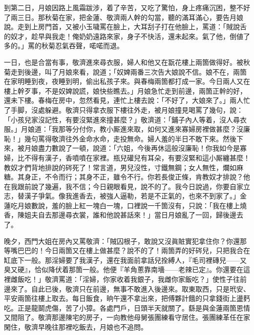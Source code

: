 到第二日，月娘因路上風霜跋涉，着了辛苦，又吃了驚怕，身上疼痛沉困，整不好了兩三日。那秋菊在家，把金蓮、敬濟兩人幹的勾當，聽的滿耳滿心，要告月娘說。走到上房門首，又被小玉噦罵在臉上，大耳刮子打在他臉上，罵道：「賊說舌的奴才，趁早與我走！俺奶奶遠路來家，身子不快活，還未起來。氣了他，倒値了多的。」罵的秋菊忍氣吞聲，喏喏而退。

一日，也是合當有事，敬濟進來尋衣服，婦人和他又在翫花樓上兩箇做得好。被秋菊走到後邊，叫了月娘來看，說道；「奴婢兩番三次告大娘說不信。娘不在，兩箇在家明睡到夜，夜睡到明，偷出私孩子來。與春梅兩箇都打成一家。今日兩人又在樓上幹歹事，不是奴婢說謊，娘快些瞧去。」月娘急忙走到前邊，兩箇正幹的好，還未下樓。春梅在房中，忽然看見，連忙上樓去說：「不好了，大娘來了。」兩人忙了手脚，沒處躲避。敬濟只得拿衣服下樓往外走，被月娘撞見喝罵了幾句，說：「小孩兒家沒記性，有要沒緊進來撞甚麼？」敬濟道：「鋪子內人等着，沒人尋衣服。」月娘道：「我那等分付你，教小厮進來取，如何又進來寡婦房裡做甚麼？沒廉恥！」幾句罵得敬濟往外金命水命，走投無命。婦人羞的半日不敢下來。{}然後下來，被月娘盡力數說了一頓，說道：「六姐，今後再休這般沒廉恥！你我如今是寡婦，比不得有漢子，香噴噴在家裡。瓶兒礶兒有耳朵，有要沒緊和這小厮纏甚麼！教奴才們背地排說的硶死了！常言道，男兒沒性，寸鐵無鋼；女人無性，爛如麻糖。其身正，不令而行；其身不正，雖令不行。你若長俊正條，肯教奴才排說？他在我跟前說了幾遍，我不信；今日親眼看見，說不的了。我今日說過，你要自家立志，替漢子爭氣。像我進香去，被強人逼勒，若是不正氣的，也來不到家了。」{}金蓮吃月娘數說，羞的臉上紅一塊白一塊，口裡說一千箇沒有，只說：「我在樓上燒香，陳姐夫自去那邊尋衣裳，誰和他說甚話來！」{}當日月娘亂了一回，歸後邊去了。

晚夕，西門大姐在房內又罵敬濟：「賊囚根子，敢說又沒眞賍實犯拿住你？你還那等嘴巴巴的！今日兩箇又在樓上做甚麼？說不的了！兩箇弄的好硶兒，只把我合在缸底下一般。那淫婦要了我漢子，還在我面前拿話兒拴縛人，『毛司裡磚兒——又臭又硬』，{}恰似降伏着那箇一般。他便『羊角蔥靠南墻——老辣已定』。你還要在這裡雌飯吃！」敬濟罵道：「淫婦，你家收着我銀子，我雌你家飯吃？」使性子往前邊來了。{}自此已後，敬濟只在前邊，無事不敢進入後邊來。取東取西，只是玳安、平安兩箇往樓上取去。每日飯食，晌午還不拿出來，把傅夥計餓的只拿錢街上盪麫吃。{}正是龍鬬虎傷，苦了小獐。各處門戶，日頭半天就關了。{}繇是與金蓮兩箇恩情又間阻了。{}敬濟那邊陳宅的房子，一向教他母舅張團練看守居住。張團練革任在家閑住，敬濟早晚往那裡吃飯去，月娘也不追問。


